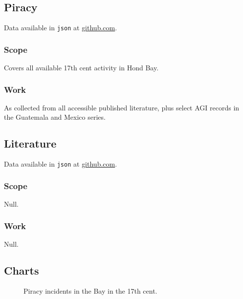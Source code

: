 \documentclass{amsart}
\newcommand{\code}[1]{\texttt{#1}}%
\theoremstyle{definition}%
\theoremstyle{definition}%
\begin{document}
\subsection{Piracy}%
\label{ss:piracy}
Data available in \code{json} at \href{http://github.com/aenavidad/pp-0}{github.com}.
\subsubsection{Scope} Covers all available 17th cent activity in Hond Bay.
\subsubsection{Work} As collected from all accessible published literature, plus select AGI records in the Guatemala and Mexico series.
%
%
%
%
\subsection{Literature}%
\label{ss:literature}
Data available in \code{json} at \href{http://github.com/aenavidad/pp-0}{github.com}.
\subsubsection{Scope} Null.
\subsubsection{Work} Null.
%
%
%
%
\subsection{Charts}
\label{ss:charts}
\lipsum[1][1-3]
\begin{figure}
\caption{Piracy incidents in the Bay in the 17th cent.}
\label{fig1}
\end{figure}
%
%
%
% 
\end{document}
